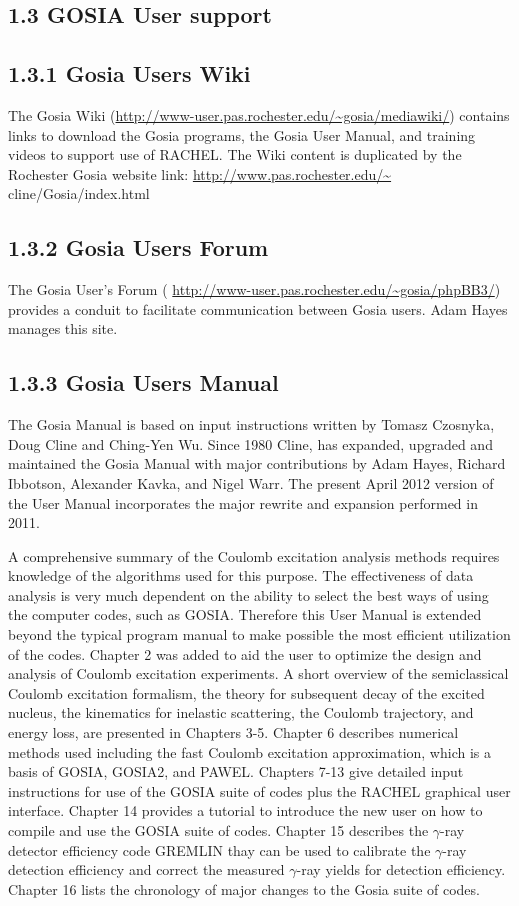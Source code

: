 \documentclass[10pt]{article}
\begin{document}
\subsection*{1.3 GOSIA User support}
\subsection*{1.3.1 Gosia Users Wiki}
The Gosia Wiki (\href{http://www-user.pas.rochester.edu/~gosia/mediawiki/}{http://www-user.pas.rochester.edu/\~{}gosia/mediawiki/}) contains links to download the Gosia programs, the Gosia User Manual, and training videos to support use of RACHEL. The Wiki content is duplicated by the Rochester Gosia website link: \href{http://www.pas.rochester.edu/~}{http://www.pas.rochester.edu/\~{}} cline/Gosia/index.html

\subsection*{1.3.2 Gosia Users Forum}
The Gosia User's Forum ( \href{http://www-user.pas.rochester.edu/~gosia/phpBB3/}{http://www-user.pas.rochester.edu/\~{}gosia/phpBB3/}) provides a conduit to facilitate communication between Gosia users. Adam Hayes manages this site.

\subsection*{1.3.3 Gosia Users Manual}
The Gosia Manual is based on input instructions written by Tomasz Czosnyka, Doug Cline and Ching-Yen Wu. Since 1980 Cline, has expanded, upgraded and maintained the Gosia Manual with major contributions by Adam Hayes, Richard Ibbotson, Alexander Kavka, and Nigel Warr. The present April 2012 version of the User Manual incorporates the major rewrite and expansion performed in 2011.

A comprehensive summary of the Coulomb excitation analysis methods requires knowledge of the algorithms used for this purpose. The effectiveness of data analysis is very much dependent on the ability to select the best ways of using the computer codes, such as GOSIA. Therefore this User Manual is extended beyond the typical program manual to make possible the most efficient utilization of the codes. Chapter 2 was added to aid the user to optimize the design and analysis of Coulomb excitation experiments. A short overview of the semiclassical Coulomb excitation formalism, the theory for subsequent decay of the excited nucleus, the kinematics for inelastic scattering, the Coulomb trajectory, and energy loss, are presented in Chapters 3-5. Chapter 6 describes numerical methods used including the fast Coulomb excitation approximation, which is a basis of GOSIA, GOSIA2, and PAWEL. Chapters 7-13 give detailed input instructions for use of the GOSIA suite of codes plus the RACHEL graphical user interface. Chapter 14 provides a tutorial to introduce the new user on how to compile and use the GOSIA suite of codes. Chapter 15 describes the $\gamma$-ray detector efficiency code GREMLIN thay can be used to calibrate the $\gamma$-ray detection efficiency and correct the measured $\gamma$-ray yields for detection efficiency. Chapter 16 lists the chronology of major changes to the Gosia suite of codes.
\end{document}
